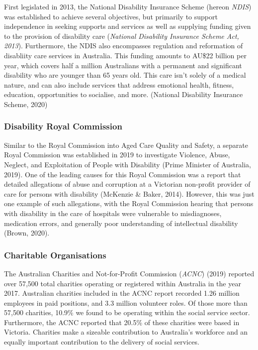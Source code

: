 \documentclass[
  11pt,
]{article}
\begin{document}
First legislated in 2013, the National Disability Insurance Scheme (hereon \emph{NDIS}) was established to achieve several objectives, but primarily to support independence in seeking supports and services as well as supplying funding given to the provision of disability care (\emph{National Disability Insurance Scheme Act, 2013}). Furthermore, the NDIS also encompasses regulation and reformation of disabliity care services in Australia. This funding amounts to AU\$22 billion per year, which covers half a million Australians with a permanent and significant disability who are younger than 65 years old. This care isn't solely of a medical nature, and can also include services that address emotional health, fitness, education, opportunities to socialise, and more. (National Disability Insurance Scheme, 2020)

\hypertarget{disability-royal-commission}{%
\subsubsection{Disability Royal Commission}\label{disability-royal-commission}}

Similar to the Royal Commission into Aged Care Quality and Safety, a separate Royal Commission was established in 2019 to investigate Violence, Abuse, Neglect, and Exploitation of People with Disability (Prime Minister of Australia, 2019). One of the leading causes for this Royal Commission was a report that detailed allegations of abuse and corruption at a Victorian non-profit provider of care for persons with disability (McKenzie \& Baker, 2014). However, this was just one example of such allegations, with the Royal Commission hearing that persons with disability in the care of hospitals were vulnerable to misdiagnoses, medication errors, and generally poor understanding of intellectual disability (Brown, 2020).

\newpage

\hypertarget{charitable-organisations}{%
\subsubsection{Charitable Organisations}\label{charitable-organisations}}

The Australian Charities and Not-for-Profit Commission (\emph{ACNC}) (2019) reported over 57,500 total charities operating or registered within Australia in the year 2017. Australian charities included in the ACNC report recorded 1.26 million employees in paid positions, and 3.3 million volunteer roles. Of those more than 57,500 charities, 10.9\% we found to be operating within the social service sector. Furthermore, the ACNC reported that 20.5\% of these charities were based in Victoria. Charities make a sizeable contribution to Australia's workforce and an equally important contribution to the delivery of social services.
\end{document}
